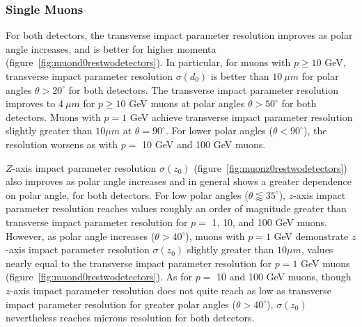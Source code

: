 \subsubsection{Single Muons}
For both detectors, the transverse impact parameter resolution improves as polar angle increases,
and is better for higher momenta (figure~\ref{fig:muond0restwodetectors}).
In particular, for muons with $p \geq 10 $ GeV, transverse impact parameter resolution $\sigma(d_{0})$ is better
than $10~\mu m$ for polar angles $\theta > 20^{\circ}$ for both detectors.
The transverse impact parameter resolution improves to $4~\mu m$ for $p \geq 10 $ GeV muons
at polar angles $\theta > 50^{\circ}$ for both detectors.
Muons with $p =  1$ GeV achieve transverse impact parameter resolution slightly greater than
$10 \mu m$ at $\theta =  90^{\circ}$.
For lower polar angles ($\theta < 90^{\circ}$), the resolution worsens as with $p = $ 10 GeV and 100 GeV muons.

$Z$-axis impact parameter resolution $\sigma(z_{0})$ (figure~\ref{fig:muonz0restwodetectors}) also improves as polar angle increases
and in general shows a greater dependence on polar angle, for both detectors.
For low polar angles ($\theta \lessapprox 35^{\circ}$), $z$-axis impact parameter resolution
reaches values roughly an order of magnitude greater than transverse impact parameter resolution
 for $p = $ 1, 10, and 100 GeV muons.
However, as polar angle increases ($\theta > 40^{\circ}$), muons with $p = 1$ GeV demonstrate
$z$-axis impact parameter resolution $\sigma(z_{0})$ slightly greater than $10 \mu m$,
values nearly equal to the transverse impact parameter resolution for $p = 1$ GeV muons (figure~\ref{fig:muond0restwodetectors}).
As for $p = $ 10 and 100 GeV muons, though $z$-axis impact parameter resolution does not quite reach
as low as transverse impact parameter resolution for greater polar angles ($\theta > 40^{\circ}$), $\sigma(z_{0})$
nevertheless reaches microns resolution for both detectors.

